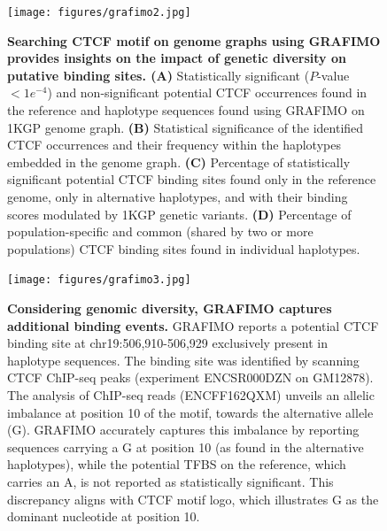 \documentclass[a4paper, titlepage, openright]{book}
\newcommand{\grafimo}{GRAFIMO\xspace}
\begin{document}
\begin{figure}
    \centering
    \texttt{[image: figures/grafimo2.jpg]}
    \caption[Searching CTCF motif on genome graphs using \grafimo provides insights on the impact of genetic diversity on putative binding sites]{\textbf{Searching CTCF motif on genome graphs using \grafimo provides insights on the impact of genetic diversity on putative binding sites. (A)} Statistically significant ($P$-value $< 1e^{-4}$) and non-significant potential CTCF occurrences found in the reference and haplotype sequences found using \grafimo on 1KGP genome graph. \textbf{(B)} Statistical significance of the identified CTCF occurrences and their frequency within the haplotypes embedded in the genome graph. \textbf{(C)} Percentage of statistically significant potential CTCF binding sites found only in the reference genome, only in alternative haplotypes, and with their binding scores modulated by 1KGP genetic variants. \textbf{(D)} Percentage of population-specific and common (shared by two or more populations) CTCF binding sites found in individual haplotypes.}
    \label{fig:grafimo-ctcf}
\end{figure}

\begin{figure}
    \centering
    \texttt{[image: figures/grafimo3.jpg]}
    \caption[Considering genomic diversity, \grafimo captures additional binding events]{\textbf{Considering genomic diversity, \grafimo captures additional binding events.} \grafimo reports a potential CTCF binding site at chr19:506,910-506,929 exclusively present in haplotype sequences. The binding site was identified by scanning CTCF ChIP-seq peaks (experiment ENCSR000DZN on GM12878). The analysis of ChIP-seq reads (ENCFF162QXM) unveils an allelic imbalance at position 10 of the motif, towards the alternative allele (G). \grafimo accurately captures this imbalance by reporting sequences carrying a G at position 10 (as found in the alternative haplotypes), while the potential TFBS on the reference, which carries an A, is not reported as statistically significant. This discrepancy aligns with CTCF motif logo, which illustrates G as the dominant nucleotide at position 10.}
    \label{fig:grafimo-allelic-imbalance}
\end{figure}

\end{document}

